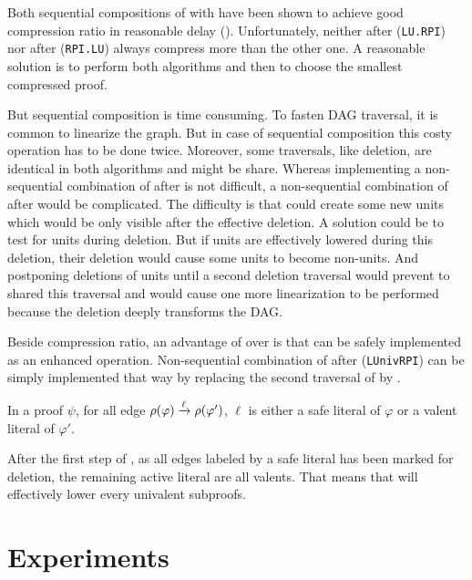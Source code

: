 \documentclass{llncs}
\begin{document}
Both sequential compositions of {\LowerUnits} with {\RPI} have been shown to achieve good
compression ratio in reasonable delay (\cite{LURPI}). Unfortunately, neither {\LowerUnits} after
{\RPI} (\texttt{LU.RPI}) nor {\RPI} after {\LowerUnits} (\texttt{RPI.LU}) always compress more than
the other one. A reasonable solution is to perform both algorithms and then to choose the smallest
compressed proof.

But sequential composition is time consuming. To fasten DAG traversal, it is common to linearize the
graph. But in case of sequential composition this costy operation has to be done twice. Moreover,
some traversals, like deletion, are identical in both algorithms and might be share. Whereas
implementing a non-sequential combination of {\RPI} after {\LowerUnits} is not difficult, a
non-sequential combination of {\LowerUnits} after {\RPI} would be complicated. The difficulty is
that {\RPI} could create some new units which would be only visible after the effective deletion.  A
solution could be to test for units during deletion. But if units are effectively lowered during
this deletion, their deletion would cause some units to become non-units. And postponing deletions
of units until a second deletion traversal would prevent to shared this traversal and would cause
one more linearization to be performed because the deletion deeply transforms the DAG.

Beside compression ratio, an advantage of {\LowerUnivalents} over {\LowerUnits} is that
{\LowerUnivalents} can be safely implemented as an enhanced  operation.
Non-sequential combination of {\LowerUnivalents} after {\RPI} (\texttt{LUnivRPI}) can be simply
implemented that way by replacing the second traversal of {\RPI} by {\LowerUnivalents}.

\begin{proposition} \label{prop:LunivRPI}
In a proof $\psi$, for all edge $\rho(\varphi) \xrightarrow{\ell} \rho(\varphi')$, $\ell$ is
either a safe literal of $\varphi$ or a valent literal of $\varphi'$.
\end{proposition}

After the first step of {\RPI}, as all edges labeled by a safe literal has been marked for deletion,
the remaining active literal are all valents. That means that {\LowerUnivalents} will effectively
lower every univalent subproofs.



\section{Experiments} \label{sec:exp}
\end{document}
